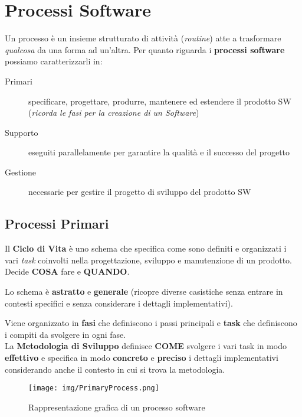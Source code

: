 \chapter{Processi Software}

Un processo \`e un insieme strutturato di attivit\`a (\textit{routine})
atte a trasformare \textit{qualcosa} da una forma ad un'altra.
Per quanto riguarda i \textbf{processi software} possiamo
caratterizzarli in:
\begin{description}
    \item[Primari] specificare, progettare, produrre, mantenere ed
                estendere il prodotto SW (\textit{ricorda le fasi
                per la creazione di un Software})
    \item[Supporto] eseguiti parallelamente per garantire la qualit\`a
                e il successo del progetto
    \item[Gestione] necessarie per gestire il progetto di sviluppo
                del prodotto SW
\end{description}

\section{Processi Primari}

Il \textbf{Ciclo di Vita} \`e uno schema che specifica come sono
definiti e organizzati i vari \textit{task} coinvolti
nella progettazione, sviluppo e manutenzione di un prodotto.
Decide \textbf{COSA} fare e \textbf{QUANDO}.

Lo schema \`e \textbf{astratto} e \textbf{generale} (ricopre diverse
casistiche senza entrare in contesti specifici e senza considerare
i dettagli implementativi).

Viene organizzato in \textbf{fasi} che definiscono i passi principali
e \textbf{task} che definiscono i compiti da svolgere in ogni fase.\\

La \textbf{Metodologia di Sviluppo} definisce \textbf{COME} svolgere
i vari task in modo \textbf{effettivo} e specifica in modo
\textbf{concreto} e \textbf{preciso} i dettagli implementativi considerando
anche il contesto in cui si trova la metodologia.

\begin{figure}[H]
    \centering
    \texttt{[image: img/PrimaryProcess.png]}
    \caption*{Rappresentazione grafica di un processo software}
\end{figure}

